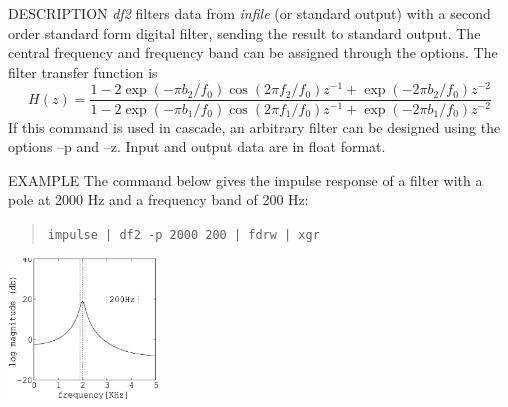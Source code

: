 \begin{synopsis}
 \item[df2] [ --f $f_0$ ] [ --p $f_1 \; b_1$ ] [ --z $f_2 \; b_2$ ] 
            [ {\em infile} ]
\end{synopsis}

\begin{qsection}{DESCRIPTION}
{\em df2} filters data from {\em infile} (or standard output) 
with a second order standard form digital filter, 
sending the result to standard output.
The central frequency and frequency band can
  be assigned through the options.
  The filter transfer function is
  \begin{displaymath}
   H(z)=\frac{1-2\exp(-\pi b_2/f_0)\cos(2\pi f_2/f_0)z^{-1} +
        \exp(-2\pi b_2/f_0)z^{-2}}
   {1-2\exp(-\pi b_1/f_0)\cos(2\pi f_1/f_0)z^{-1}+\exp(-2\pi b_1/f_0)z^{-2}}
  \end{displaymath}
 If this command is used in cascade, an arbitrary filter can be
 designed using the options --p and --z.
 Input and output data are in float format.
\end{qsection}

\begin{options}
\end{options} 

\begin{qsection}{EXAMPLE}
The command below gives the impulse response of a filter with
a pole at 2000 Hz and a frequency band of 200 Hz:
\begin{quote}
 \verb!impulse | df2 -p 2000 200 | fdrw | xgr !
\end{quote}
\hspace{3cm}
\includegraphics[width=4cm]{fig/df2.eps}
\end{qsection}
